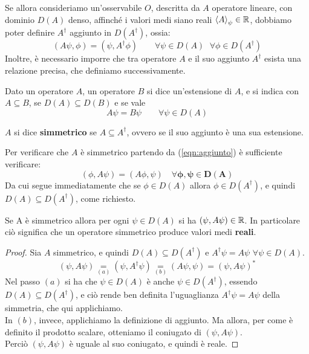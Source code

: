 \documentclass[FisicaTeorica.tex]{subfiles}
\begin{document}
	Se allora consideriamo un'osservabile $O$, descritta da $A$ operatore lineare, con dominio $D(A)$ denso, affinché i valori medi siano reali $\left\langle A\right\rangle_\psi\in\mathbb{R}$, dobbiamo poter definire $A^\dag$ aggiunto in $D(A^\dag)$, ossia:
\begin{equation}
\left(A\psi,\phi\right) = \left(\psi,A^\dag\phi\right) \qquad \forall \psi \in D\left(A\right) \, \ \ \forall \phi \in D\left(A^\dag\right)
\label{eqn:aggiunto}
\end{equation}
Inoltre, è necessario imporre che tra operatore $A$ e il suo aggiunto $A^\dag$ esista una relazione precisa, che definiamo successivamente.
\begin{dfn}
Dato un operatore $A$, un operatore $B$ si dice un'estensione di $A$, e si indica con $A \subseteq B$, se $D(A) \subseteq D(B)$ e se vale
\[
A \psi = B \psi \qquad \forall \psi \in D(A)
\]
\end{dfn}
\begin{dfn}
$A$ si dice \textbf{simmetrico} se $A \subseteq A^\dag$, ovvero se il suo aggiunto è una sua estensione.
\end{dfn}
Per verificare che $A$ è simmetrico partendo da (\ref{eqn:aggiunto}) è sufficiente verificare:
\[ 
\left(\phi,A\psi\right)=\left(A\phi,\psi\right)\quad \bm{\forall \phi, \psi \in D\left(A\right)}
\]
Da cui segue immediatamente che se $\phi \in D\left(A\right)$ allora $\phi \in D\left(A^\dag\right)$, e quindi $D(A)\subseteq D(A^\dag)$, come richiesto.

\begin{thm}
Se A è simmetrico allora per ogni $\psi \in D(A)$ si ha  $\left(\psi,A\psi\right)\in \mathbb{R}$. In particolare ciò significa che un operatore simmetrico produce valori medi \textbf{reali}.
\end{thm}
\begin{proof}
Sia $A$ simmetrico, e quindi $D(A) \subseteq D(A^\dag)$ e $A^\dag \psi = A\psi$ $\forall \psi \in D(A)$. 
\[
(\psi, A\psi) \underset{(a)}{=} (\psi,A^\dag \psi) \underset{(b)}{=} (A\psi, \psi) = (\psi,A\psi)^*
\]
Nel passo $(a)$ si ha che $\psi \in D(A)$ è anche $\psi \in D(A^\dag)$, essendo $D(A)\subseteq D(A^\dag)$, e ciò rende ben definita l'uguaglianza $A^\dag \psi = A\psi$ della simmetria, che qui applichiamo.\\
In $(b)$, invece, applichiamo la definizione di aggiunto. Ma allora, per come è definito il prodotto scalare, otteniamo il coniugato di $(\psi,A\psi)$.\\
Perciò $(\psi,A\psi)$ è uguale al suo coniugato, e quindi è reale.
\end{proof}
\end{document}
